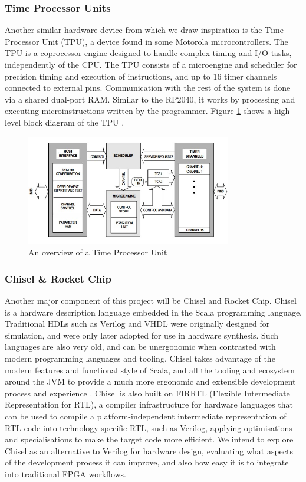 \documentclass[a4paper,fleqn,12pt]{article}
\begin{document}
\subsubsection{Time Processor Units}

Another similar hardware device from which we draw inspiration is the Time Processor Unit (TPU), a device found in some Motorola microcontrollers. The TPU is a coprocessor engine designed to handle complex timing and I/O tasks, independently of the CPU. The TPU consists of a microengine and scheduler for precision timing and execution of instructions, and up to 16 timer channels connected to external pins. Communication with the rest of the system is done via a shared dual-port RAM. Similar to the RP2040, it works by processing and executing microinstructions written by the programmer. Figure \ref{fig:tpu} shows a high-level block diagram of the TPU \citep{tpu}.

\begin{figure}[]
    \centering
    \includegraphics[width=0.8\textwidth]{../img/tpu.jpg}
    \caption{An overview of a Time Processor Unit \citep{tpu}}
    \label{fig:tpu}
\end{figure}

\subsubsection{Chisel \& Rocket Chip}

Another major component of this project will be Chisel and Rocket Chip. Chisel is a hardware description language embedded in the Scala programming language. Traditional HDLs such as Verilog and VHDL were originally designed for simulation, and were only later adopted for use in hardware synthesis. Such languages are also very old, and can be unergonomic when contrasted with modern programming languages and tooling. Chisel takes advantage of the modern features and functional style of Scala, and all the tooling and ecosystem around the JVM to provide a much more ergonomic and extensible development process and experience \citep{chisel}. Chisel is also built on FIRRTL (Flexible Intermediate Representation for RTL), a compiler infrastructure for hardware languages that can be used to compile a platform-independent intermediate representation of RTL code into technology-specific RTL, such as Verilog, applying optimisations and specialisations to make the target code more efficient\citep{firrtl}. We intend to explore Chisel as an alternative to Verilog for hardware design, evaluating what aspects of the development process it can improve, and also how easy it is to integrate into traditional FPGA workflows.
\end{document}
